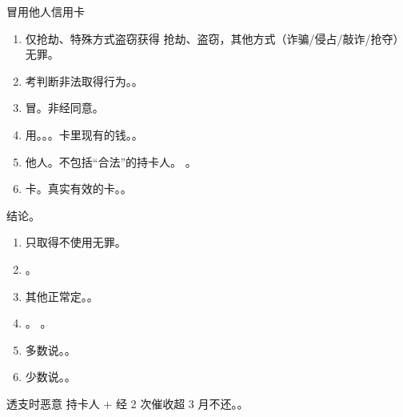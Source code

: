 \begin{enumerate}
\begin{enumerate}
\begin{enumerate}
                        \begin{kk}{冒用他人信用卡}
                          \begin{enumerate}
                            \item 仅抢劫、特殊方式盗窃获得 \yjt 抢劫、盗窃，其他方式（诈骗/侵占/敲诈/抢夺） \yjt 无罪。
                            \item 考判断非法取得行为。。
                            \item 冒。非经同意。
                            \item 用。\yi {}。\er {}。\san 卡里现有的钱。。
                            \item 他人。不包括“合法”的持卡人。
                                  。
                            \item 卡。真实有效的卡。。
                          \end{enumerate}
                          \tcblower
                          结论。
                          \begin{enumerate}
                            \item 只取得不使用无罪。
                            \item {}。
                            \item 其他正常定。。
                            \item {}。
                                  。
                            \item 多数说。。
                            \item 少数说。。
                          \end{enumerate}
                        \end{kk}

                        \begin{kk}{透支时恶意}
                          持卡人 + 经 2 次催收超 3 月不还。。
                        \end{kk}


\end{enumerate}
\end{enumerate}
\end{enumerate}
